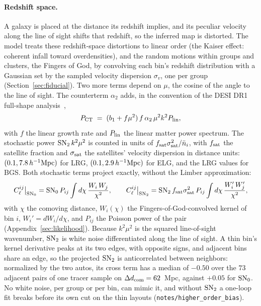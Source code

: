 \documentclass[11pt]{article}
\newcommand{\SNz}{{\rm SN}_0}
\newcommand{\SNt}{{\rm SN}_2}
\begin{document}
\paragraph{Redshift space.}
A galaxy is placed at the distance its redshift implies, and its
peculiar velocity along the line of sight shifts that redshift, so the
inferred map is distorted.  The model treats these redshift-space
distortions to linear order (the Kaiser effect: coherent infall toward
overdensities), and the random motions within groups and clusters, the
Fingers of God, by convolving each bin's redshift distribution with a
Gaussian set by the sampled velocity dispersion $\sigma_v$, one per
group (Section~\ref{sec:fiducial}).  Two more terms depend on
$\mu$, the cosine of the angle to the line of sight.  The counterterm
$\alpha_2$ adds, in the convention of the DESI DR1 full-shape
analysis~\cite{Maus2024},
\begin{equation}
  P_{\rm CT} \;=\; (b_1 + f\mu^2)\,f\,\alpha_2\,\mu^2 k^2 P_{\rm lin} ,
  \label{eq:alpha2}
\end{equation}
with $f$ the linear growth rate and $P_{\rm lin}$ the linear matter
power spectrum.  The stochastic power $\SNt\,k^2\mu^2$ is counted in
units of $f_{\rm sat}\sigma_{\rm sat}^2/\bar{n}_i$, with $f_{\rm sat}$
the satellite fraction and $\sigma_{\rm sat}$ the satellites' velocity
dispersion in distance units: $(0.1, 7.8\,h^{-1}{\rm Mpc})$ for LRG,
$(0.1, 2.9\,h^{-1}{\rm Mpc})$ for ELG, and the LRG values for BGS.
Both stochastic terms project exactly, without the Limber
approximation:
\begin{equation}
  C^{ij}_\ell\big|_{\SNz} = \SNz\,P_{ij} \int d\chi\,
  \frac{W_i\,W_j}{\chi^2} ,
  \qquad
  C^{ij}_\ell\big|_{\SNt} = \SNt\,f_{\rm sat}\sigma_{\rm sat}^2\,P_{ij}
  \int d\chi\, \frac{W_i'\,W_j'}{\chi^2} ,
  \label{eq:snproj}
\end{equation}
with $\chi$ the comoving distance, $W_i(\chi)$ the
Fingers-of-God-convolved kernel of bin $i$, $W_i' = dW_i/d\chi$, and
$P_{ij}$ the Poisson power of the pair (Appendix~\ref{sec:likelihood}).
Because $k^2\mu^2$ is the squared line-of-sight wavenumber, $\SNt$ is
white noise differentiated along the line of sight.  A thin bin's
kernel derivative peaks at its two edges, with opposite signs, and
adjacent bins share an edge, so the projected $\SNt$ is anticorrelated
between neighbors: normalized by the two autos, its cross term has a
median of $-0.50$ over the $73$ adjacent pairs of one tracer sample on
$\Delta d_{\rm com} = 62$~Mpc, against $+0.05$ for $\SNz$.  No white
noise, per group or per bin, can mimic it, and without $\SNt$ a
one-loop fit breaks before its own cut on the thin layouts
(\texttt{notes/higher\_order\_bias}).
\end{document}

